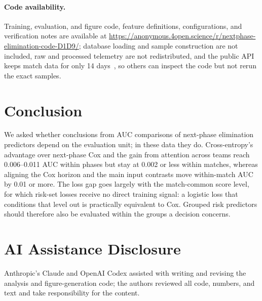 \documentclass[sigconf,anonymous]{acmart}
\newcommand{\artifacturl}{\url{https://anonymous.4open.science/r/nextphase-elimination-code-D1D9/}}
\begin{document}
\paragraph{Code availability.}
Training, evaluation, and figure code, feature definitions, configurations, and verification notes are available at \artifacturl{}; database loading and sample construction are not included, raw and processed telemetry are not redistributed, and the public API keeps match data for only 14 days~\cite{PUBGAPI}, so others can inspect the code but not rerun the exact samples.

\section{Conclusion}
\label{sec:conclusion}
We asked whether conclusions from AUC comparisons of next-phase elimination predictors depend on the evaluation unit; in these data they do. Cross-entropy's advantage over next-phase Cox and the gain from attention across teams reach 0.006--0.011 AUC within phases but stay at 0.002 or less within matches, whereas aligning the Cox horizon and the main input contrasts move within-match AUC by 0.01 or more. The loss gap goes largely with the match-common score level, for which risk-set losses receive no direct training signal: a logistic loss that conditions that level out is practically equivalent to Cox. Grouped risk predictors should therefore also be evaluated within the groups a decision concerns.

\section*{AI Assistance Disclosure}
Anthropic's Claude and OpenAI Codex assisted with writing and revising the analysis and figure-generation code; the authors reviewed all code, numbers, and text and take responsibility for the content.



\end{document}
